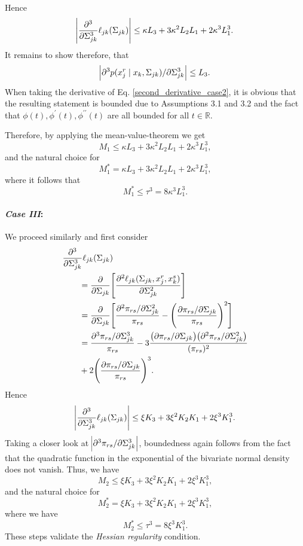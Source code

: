 \begin{condition}
\begin{enumerate}
\begin{align*}
              \end{align*}
              Hence \[\abs{\frac{\partial^3}{\partial\Sigma_{jk}^3}\ell_{jk}(\Sigma_{jk})}
                  \leq \kappa L_3 + 3\kappa^2L_2L_1 + 2 \kappa^3L_1^3.\]
              It remains to show therefore, that \[\abs{\partial^3 p(x_j^{r} \mid x_{k}, \Sigma_{jk}) / \partial \Sigma_{jk}^3} \leq L_3.\]
              When taking the derivative of Eq. \eqref{second_derivative_case2}, it is obvious that the resulting statement is bounded due to Assumptions 3.1 and 3.2
              and the fact that $\phi(t), \phi^\prime(t), \phi^{\prime\prime}(t)$ are all bounded for all $t \in \mathbb{R}$.

              Therefore, by applying the mean-value-theorem we get \[M_1 \leq \kappa L_3 + 3\kappa^2L_2L_1 + 2 \kappa^3L_1^3,\]
              and the natural choice for \[M_1^* = \kappa L_3 + 3\kappa^2L_2L_1 + 2 \kappa^3L_1^3,\] where it follows that \[M_1^* \leq \tau^3 = 8\kappa^3L_1^3.\]

              \paragraph{\textit{Case III}:} We proceed similarly and first consider
              \begin{align}
                  \begin{split}
                      \MoveEqLeft \frac{\partial^3}{\partial\Sigma_{jk}^3}\ell_{jk}(\Sigma_{jk}) \\
                      & = \frac{\partial}{\partial\Sigma_{jk}}\Bigg[\frac{\partial^2 \ell_{jk}(\Sigma_{jk}, x_j^r,x_k^s)}{\partial \Sigma_{jk}^{2}}\Bigg] \\
                      &= \frac{\partial}{\partial\Sigma_{jk}}\Bigg[\frac{\partial^2 \pi_{rs}/\partial \Sigma_{jk}^{2}}{\pi_{rs}} - \Bigg(\frac{\partial \pi_{rs}/\partial \Sigma_{jk}}{\pi_{rs}}\Bigg)^2\Bigg] \\
                      &= \frac{\partial^3 \pi_{rs} / \partial \Sigma_{jk}^3}{\pi_{rs}} - 3\frac{\big(\partial \pi_{rs} / \partial \Sigma_{jk}\big)\big( \partial^2 \pi_{rs} / \partial \Sigma_{jk}^2\big)}{(\pi_{rs})^2} \\
                      &+ 2\Bigg(\frac{\partial \pi_{rs} / \partial \Sigma_{jk}}{\pi_{rs}}\Bigg)^3.
                  \end{split}
              \end{align}
              Hence \[\abs{\frac{\partial^3}{\partial\Sigma_{jk}^3}\ell_{jk}(\Sigma_{jk})} \leq \xi K_3 + 3\xi^2K_2K_1 + 2 \xi^3K_1^3.\]
              Taking a closer look at $\abs{\partial^3 \pi_{rs} / \partial \Sigma_{jk}^3}$, boundedness again follows from the fact that the quadratic function in the exponential of the bivariate normal density does not vanish. Thus, we have \[M_2 \leq \xi K_3 + 3\xi^2K_2K_1 + 2 \xi^3K_1^3,\] and the natural choice for \[M_2^* = \xi K_3 + 3\xi^2K_2K_1 + 2 \xi^3K_1^3,\] where we have \[M_2^* \leq \tau^3 = 8\xi^3K_1^3.\] These steps validate the \textit{Hessian regularity} condition.
    \end{enumerate}


\end{condition}
